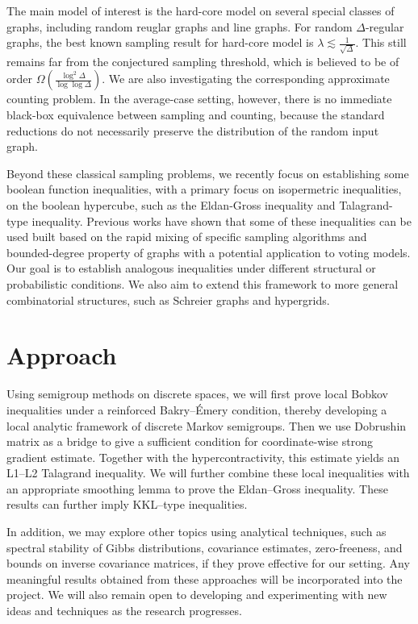 \documentclass[letterpaper]{article}
\begin{document}
The main model of interest is the hard-core model on several special classes of graphs, including random reuglar graphs and line graphs.
For random $\Delta$-regular graphs, the best known sampling result for hard-core model is $\lambda \lesssim \frac{1}{\sqrt \Delta}$.
This still remains far from the conjectured sampling threshold, which is believed to be of order $\Omega(\frac{\log^2\Delta}{\log \log \Delta})$.
We are also investigating the corresponding approximate counting problem.
In the average-case setting, however, there is no immediate black-box equivalence between sampling and counting, because the standard reductions do not necessarily preserve the distribution of the random input graph.

Beyond these classical sampling problems, we recently focus on establishing some boolean function inequalities, with a primary focus on isopermetric inequalities, on the boolean hypercube, such as the Eldan-Gross inequality and Talagrand-type inequality.
Previous works have shown that some of these inequalities can be used built based on the rapid mixing of specific sampling algorithms and bounded-degree property of graphs with a potential application to voting models.
Our goal is to establish analogous inequalities under different structural or probabilistic conditions.
We also aim to extend this framework to more general combinatorial structures, such as Schreier graphs and hypergrids.



\section*{Approach}

Using semigroup methods on discrete spaces, we will first prove local Bobkov inequalities under a reinforced Bakry--Émery condition, thereby developing a local analytic framework of discrete Markov semigroups.
Then we use Dobrushin matrix as a bridge to give a sufficient condition for coordinate-wise strong gradient estimate.
Together with the hypercontractivity, this estimate yields an L1--L2 Talagrand inequality.
We will further combine these local inequalities with an appropriate smoothing lemma to prove the Eldan--Gross inequality.
These results can further imply KKL--type inequalities.

In addition, we may explore other topics using analytical techniques, such as spectral stability of Gibbs distributions, covariance estimates, zero-freeness, and bounds on inverse covariance matrices, if they prove effective for our setting. Any meaningful results obtained from these approaches will be incorporated into the project. We will also remain open to developing and experimenting with new ideas and techniques as the research progresses.
\end{document}
